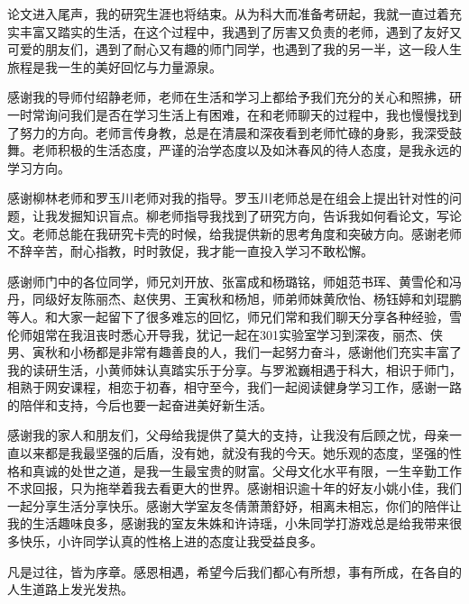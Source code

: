 

\begin{ack}
论文进入尾声，我的研究生涯也将结束。从为科大而准备考研起，我就一直过着充实丰富又踏实的生活，在这个过程中，我遇到了厉害又负责的老师，遇到了友好又可爱的朋友们，遇到了耐心又有趣的师门同学，也遇到了我的另一半，这一段人生旅程是我一生的美好回忆与力量源泉。

感谢我的导师付绍静老师，老师在生活和学习上都给予我们充分的关心和照拂，研一时常询问我们是否在学习生活上有困难，在和老师聊天的过程中，我也慢慢找到了努力的方向。老师言传身教，总是在清晨和深夜看到老师忙碌的身影，我深受鼓舞。老师积极的生活态度，严谨的治学态度以及如沐春风的待人态度，是我永远的学习方向。

感谢柳林老师和罗玉川老师对我的指导。罗玉川老师总是在组会上提出针对性的问题，让我发掘知识盲点。柳老师指导我找到了研究方向，告诉我如何看论文，写论文。老师总能在我研究卡壳的时候，给我提供新的思考角度和突破方向。感谢老师不辞辛苦，耐心指教，时时敦促，我才能一直投入学习不敢松懈。

感谢师门中的各位同学，师兄刘开放、张富成和杨璐铭，师姐范书珲、黄雪伦和冯丹，同级好友陈丽杰、赵侠男、王寅秋和杨旭，师弟师妹黄欣怡、杨钰婷和刘琨鹏等人。和大家一起留下了很多难忘的回忆，师兄们常和我们聊天分享各种经验，雪伦师姐常在我沮丧时悉心开导我，犹记一起在301实验室学习到深夜，丽杰、侠男、寅秋和小杨都是非常有趣善良的人，我们一起努力奋斗，感谢他们充实丰富了我的读研生活，小黄师妹认真踏实乐于分享。与罗淞巍相遇于科大，相识于师门，相熟于网安课程，相恋于初春，相守至今，我们一起阅读健身学习工作，感谢一路的陪伴和支持，今后也要一起奋进美好新生活。

感谢我的家人和朋友们，父母给我提供了莫大的支持，让我没有后顾之忧，母亲一直以来都是我最坚强的后盾，没有她，就没有我的今天。她乐观的态度，坚强的性格和真诚的处世之道，是我一生最宝贵的财富。父母文化水平有限，一生辛勤工作不求回报，只为拖举着我去看更大的世界。感谢相识逾十年的好友小姚小佳，我们一起分享生活分享快乐。感谢大学室友冬倩萧萧舒妤，相离未相忘，你们的陪伴让我的生活趣味良多，感谢我的室友朱姝和许诗瑶，小朱同学打游戏总是给我带来很多快乐，小许同学认真的性格上进的态度让我受益良多。

凡是过往，皆为序章。感恩相遇，希望今后我们都心有所想，事有所成，在各自的人生道路上发光发热。
\end{ack}
